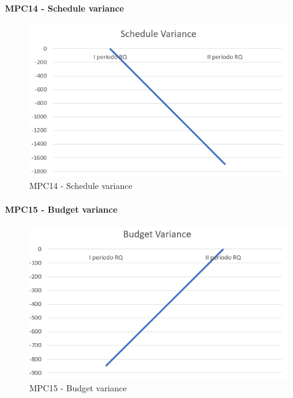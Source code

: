   \paragraph{MPC14 - Schedule variance}
  \begin{figure}[h!]
    \centering
      \includegraphics[scale=1]{Immagini/ScheduleVariance.PNG}
    \caption{MPC14 - Schedule variance}
  \end{figure}




  \paragraph{MPC15 - Budget variance}
  \begin{figure}[h!]
    \centering
      \includegraphics[scale=1]{Immagini/BudgetVariance.PNG}
    \caption{MPC15 - Budget variance}
  \end{figure}



  \clearpage
